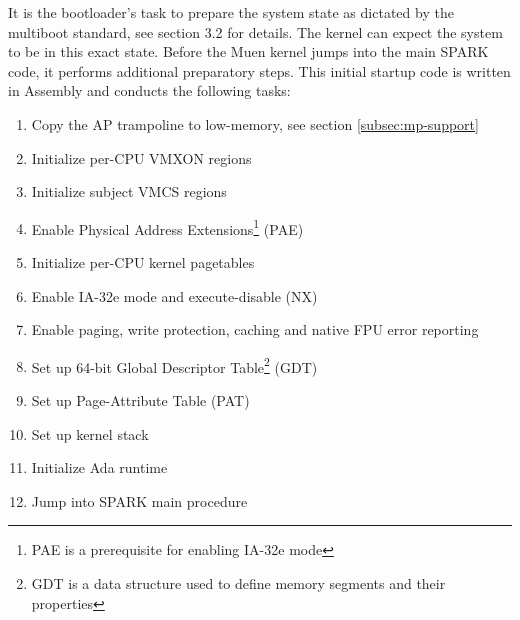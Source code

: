 It is the bootloader's task to prepare the system state as dictated by the
multiboot standard, see \cite{multiboot} section 3.2 for details. The kernel
can expect the system to be in this exact state. Before the Muen kernel jumps
into the main SPARK code, it performs additional preparatory steps. This
initial startup code is written in Assembly and conducts the following tasks:

\begin{enumerate}
	\item Copy the AP trampoline to low-memory, see section
		\ref{subsec:mp-support} \item Initialize per-CPU VMXON regions
	\item Initialize subject VMCS regions
	\item Enable Physical Address Extensions\footnote{PAE is a prerequisite for enabling IA-32e mode} (PAE)
	\item Initialize per-CPU kernel pagetables
	\item Enable IA-32e mode and execute-disable (NX)
	\item Enable paging, write protection, caching and native FPU error
		reporting
	\item Set up 64-bit Global Descriptor Table\footnote{GDT is a data structure used to define memory segments and their properties} (GDT)
	\item Set up Page-Attribute Table (PAT)
	\item Set up kernel stack
	\item Initialize Ada runtime
	\item Jump into SPARK main procedure
\end{enumerate}
